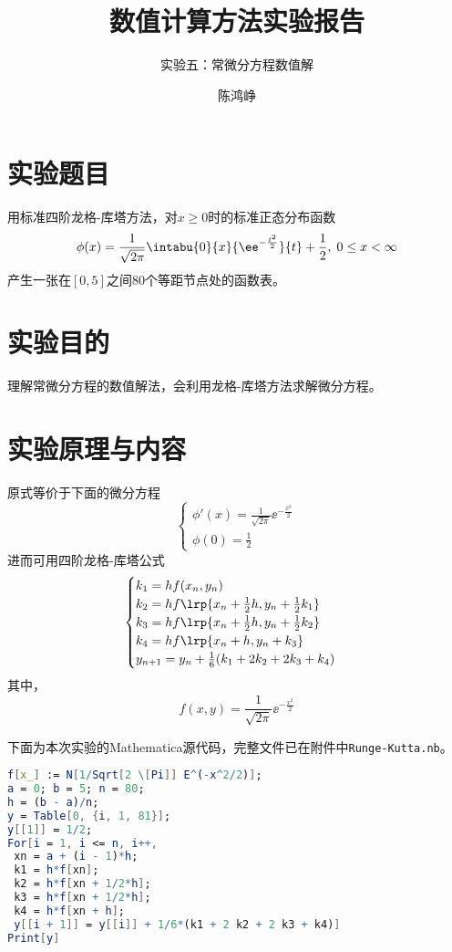 \documentclass[reportComp]{thesis}
\title{数值计算方法实验报告}
\subtitle{实验五：常微分方程数值解}
\author{陈鸿峥}
\begin{document}
\maketitle

\section{实验题目}
用标准四阶龙格-库塔方法，对$x\geq 0$时的标准正态分布函数
\[\phi(x)=\frac{1}{\sqrt{2\pi}}\intabu{0}{x}{\ee^{-\frac{t^2}{2}}}{t}+\frac{1}{2},\;0\leq x<\infty\]
产生一张在$[0,5]$之间$80$个等距节点处的函数表。

\section{实验目的}
理解常微分方程的数值解法，会利用龙格-库塔方法求解微分方程。

\section{实验原理与内容}
原式等价于下面的微分方程
\[\begin{cases}
\phi'(x)=\frac{1}{\sqrt{2\pi}}\ee^{-\frac{x^2}{2}}\\
\phi(0)=\frac{1}{2}
\end{cases}\]
进而可用四阶龙格-库塔公式
\[\begin{cases}
k_1=hf(x_n,y_n)\\
k_2=hf\lrp{x_n+\frac{1}{2}h,y_n+\frac{1}{2}k_1}\\
k_3=hf\lrp{x_n+\frac{1}{2}h,y_n+\frac{1}{2}k_2}\\
k_4=hf\lrp{x_n+h,y_n+k_3}\\
y_{n+1}=y_n+\frac{1}{6}(k_1+2k_2+2k_3+k_4)
\end{cases}\]
其中，
\[f(x,y)=\frac{1}{\sqrt{2\pi}}\ee^{-\frac{x^2}{2}}\]

下面为本次实验的Mathematica源代码，完整文件已在附件中\verb'Runge-Kutta.nb'。
\begin{lstlisting}[language=mathematica]
f[x_] := N[1/Sqrt[2 \[Pi]] E^(-x^2/2)];
a = 0; b = 5; n = 80;
h = (b - a)/n;
y = Table[0, {i, 1, 81}];
y[[1]] = 1/2;
For[i = 1, i <= n, i++,
 xn = a + (i - 1)*h;
 k1 = h*f[xn];
 k2 = h*f[xn + 1/2*h];
 k3 = h*f[xn + 1/2*h];
 k4 = h*f[xn + h];
 y[[i + 1]] = y[[i]] + 1/6*(k1 + 2 k2 + 2 k3 + k4)]
Print[y]
\end{lstlisting}
\end{document}
